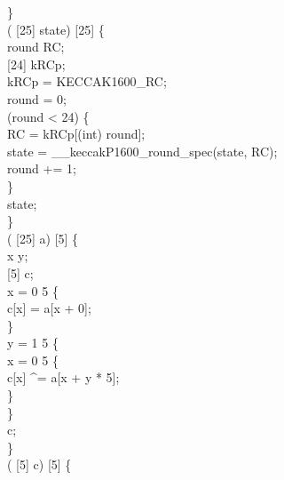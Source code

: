 \}\\
  ( [25] state) \jasminarrow{}  [25] \{\\
  round RC;\\
 [24] kRCp;\\
kRCp = KECCAK1600_RC;\\
round = 0;\\
  (round < 24) \{\\
RC = kRCp[(int) round];\\
state = __keccakP1600_round_spec(state, RC);\\
round += 1;\\
\}\\
 state;\\
\}\\
  ( [25] a) \jasminarrow{}  [5] \{\\
  x y;\\
 [5] c;\\
 x = 0  5 \{\\
c[x] = a[x + 0];\\
\}\\
 y = 1  5 \{\\
 x = 0  5 \{\\
c[x] \textasciicircum{}= a[x + y * 5];\\
\}\\
\}\\
 c;\\
\}\\
  ( [5] c) \jasminarrow{}  [5] \{\\
